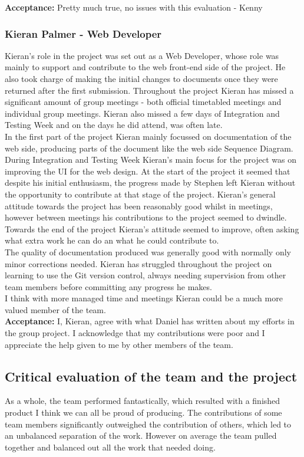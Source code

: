 \documentclass{article}
\begin{document}
{\bf Acceptance:} Pretty much true, no issues with this evaluation - Kenny


		\subsubsection{Kieran Palmer - Web Developer}
		Kieran's role in the project was set out as a Web Developer, whose role was mainly to support and contribute to the web front-end side of the project. He also took charge of making the initial changes to documents once they were returned after the first submission. Throughout the project Kieran has missed a significant amount of group meetings - both official timetabled meetings and individual group meetings. Kieran also missed a few days of Integration and Testing Week and on the days he did attend, was often late. \\
		In the first part of the project Kieran mainly focussed on documentation of the web side, producing parts of the document like the web side Sequence Diagram. During Integration and Testing Week Kieran's main focus for the project was on improving the UI for the web design. At the start of the project it seemed that despite his initial enthusiasm, the progress made by Stephen left Kieran without the opportunity to contribute at that stage of the project. Kieran's general attitude towards the project has been reasonably good whilst in meetings, however between meetings his contributions to the project seemed to dwindle. Towards the end of the project Kieran's attitude seemed to improve, often asking what extra work he can do an what he could contribute to. \\
		
		The quality of documentation produced was generally good with normally only minor corrections needed.	Kieran has struggled throughout the project on learning to use the Git version control, always needing supervision from other team members before committing any progress he makes. \\
		
		I think with more managed time and meetings Kieran could be a much more valued member of the team. \\
		
{\bf Acceptance:} I, Kieran, agree with what Daniel has written about my efforts in the group project. I acknowledge that my contributions were poor and I appreciate the help given to me by other members of the team.


		\subsection{Critical evaluation of the team and the project}
		As a whole, the team performed fantastically, which resulted with a finished product I think we can all be proud of producing. The contributions of some team members significantly outweighed the contribution of others, which led to an unbalanced separation of the work. However on average the team pulled together and balanced out all the work that needed doing. \\
\end{document}
